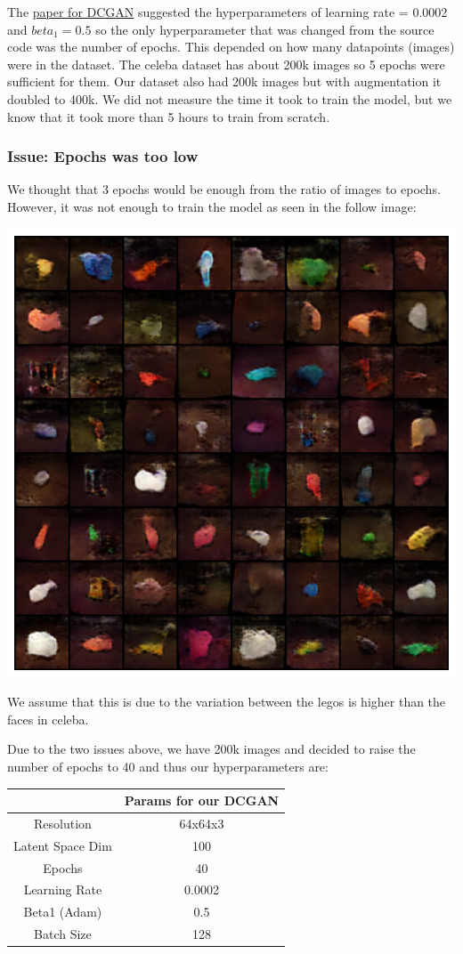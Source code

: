 \documentclass[]{article}
\begin{document}
The \href{https://arxiv.org/pdf/1511.06434.pdf}{paper for DCGAN} suggested the
hyperparameters of learning rate = 0.0002 and $beta_1=0.5$ so
the only hyperparameter that was changed from the source code was the number of epochs.
This depended on how many datapoints (images) were in the dataset. The celeba dataset
has about 200k images so 5 epochs were sufficient for them. Our dataset also had
200k images but with augmentation it doubled to 400k. We did not measure the time it took to train the model, but we know that it took more than 5 hours to train from scratch.

\subsubsection*{Issue: Epochs was too low}
We thought that 3 epochs would be enough from the ratio of images to epochs. However, it 
was not enough to train the model as seen in the follow image:
\begin{center}
\includegraphics[scale=0.5]{./imgs/3epochs.png}
\end{center}
We assume that this is due to the variation between the legos is higher than the faces in celeba.


\noindent Due to the two issues above, we have 200k images and decided to raise the number 
of epochs to 40 and thus our hyperparameters are:
\begin{center}
\begin{tabular}{|c|c|}
\hline
& Params for our DCGAN \\ \hline
Resolution & 64x64x3 \\ \hline
Latent Space Dim & 100 \\ \hline
Epochs & 40 \\ \hline
Learning Rate & 0.0002 \\ \hline
Beta1 (Adam) & 0.5 \\ \hline
Batch Size & 128 \\ \hline
\end{tabular}
\end{center}
\end{document}
